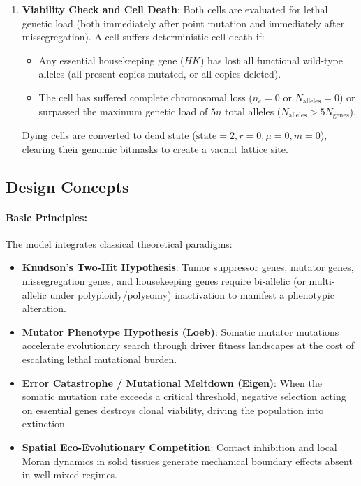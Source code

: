 \documentclass[11pt,a4paper]{article}
\begin{document}
\begin{enumerate}
    \item \textbf{Viability Check and Cell Death}:
    Both cells are evaluated for lethal genetic load (both immediately after point mutation and immediately after missegregation). A cell suffers deterministic cell death if:
    \begin{itemize}
        \item Any essential housekeeping gene ($HK$) has lost all functional wild-type alleles (all present copies mutated, or all copies deleted).
        \item The cell has suffered complete chromosomal loss ($n_c = 0$ or $N_{\text{alleles}} = 0$) or surpassed the maximum genetic load of $5n$ total alleles ($N_{\text{alleles}} > 5 N_{\text{genes}}$).
    \end{itemize}
    Dying cells are converted to dead state ($\text{state} = 2, r = 0, \mu = 0, m = 0$), clearing their genomic bitmasks to create a vacant lattice site.
\end{enumerate}

\subsection{Design Concepts}

\paragraph{Basic Principles:}
The model integrates classical theoretical paradigms:
\begin{itemize}
    \item \textbf{Knudson's Two-Hit Hypothesis}: Tumor suppressor genes, mutator genes, missegregation genes, and housekeeping genes require bi-allelic (or multi-allelic under polyploidy/polysomy) inactivation to manifest a phenotypic alteration.
    \item \textbf{Mutator Phenotype Hypothesis (Loeb)}: Somatic mutator mutations accelerate evolutionary search through driver fitness landscapes at the cost of escalating lethal mutational burden.
    \item \textbf{Error Catastrophe / Mutational Meltdown (Eigen)}: When the somatic mutation rate exceeds a critical threshold, negative selection acting on essential genes destroys clonal viability, driving the population into extinction.
    \item \textbf{Spatial Eco-Evolutionary Competition}: Contact inhibition and local Moran dynamics in solid tissues generate mechanical boundary effects absent in well-mixed regimes.
\end{itemize}
\end{document}
